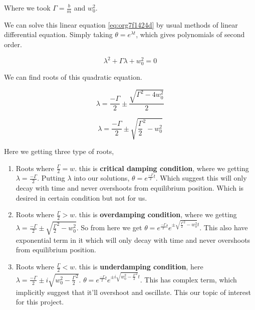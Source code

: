 \documentclass[11pt,a4paper]{article}
\begin{document}
Where we took \(\Gamma = \frac{b}{m}\) and \(w_{0}^{2}\).

We can solve this linear equation \ref{eq:org7f1424d} by usual methods of linear differential equation. Simply taking \(\theta=e^{\lambda t}\), which gives polynomials of second order.

\begin{equation}
\label{eq:org7932375}
\lambda^{2}+\Gamma\lambda+w_{0}^{2}=0
\end{equation}

We can find roots of this quadratic equation.

\begin{equation}
\label{eq:org6611d7e}
\lambda = \frac{-\Gamma}{2} \pm \frac{\sqrt{\Gamma^{2}-4w_{0}^{2}}}{2}
\end{equation}

\begin{equation}
\label{eq:org99d361b}
\lambda = \frac{-\Gamma}{2} \pm \sqrt{\frac{\Gamma}{2}^{2}-w_{0}^{2}}
\end{equation}

Here we getting three type of roots,

\begin{enumerate}
\item Roots where \(\frac{\Gamma}{2}=w\). this is \textbf{critical damping condition}, where we getting \(\lambda=\frac{-\Gamma}{2}\). Putting \(\lambda\) into our solutions, \(\theta = e^{\frac{-\Gamma}{2}t}\). Which suggest this will only decay with time and never overshoots from equilibrium position. Which is desired in certain condition but not for us.

\item Roots where \(\frac{\Gamma}{2}>w\). this is \textbf{overdamping condition}, where we getting \(\lambda=\frac{-\Gamma}{2}\pm\sqrt{\frac{\Gamma}{2}^{2}-w_{0}^{2}}\). So from here we get \(\theta = e^{\frac{-\Gamma}{2}t}e^{\pm\sqrt{\frac{\Gamma}{2}^{2}-w_{0}^{2}}t}\). This also have exponential term in it which will only decay with time and never overshoots from equilibrium position.

\item Roots where \(\frac{\Gamma}{2}<w\). this is \textbf{underdamping condition}, here  \(\lambda=\frac{-\Gamma}{2}\pm i\sqrt{w_{0}^{2}-\frac{\Gamma}{2}^{2}}\). \(\theta = e^{\frac{-\Gamma}{2}t}e^{\pm i \sqrt{w_{0}^{2}-\frac{\Gamma}{2}^{2}}t}\). This has complex term, which implicitly suggest that it'll overshoot and oscillate. This our topic of interest for this project.
\end{enumerate}
\end{document}
